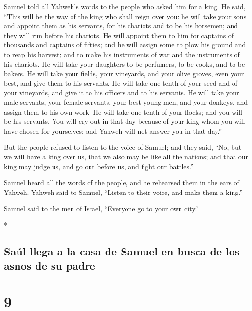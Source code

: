 \begin{paracol}{2}
\begin{otherlanguage}{english}
 Samuel told all Yahweh's words to the people who asked
him for a king.  He said, ``This will be the way of the
king who shall reign over you: he will take your sons and appoint them
as his servants, for his chariots and to be his horsemen; and they will
run before his chariots.  He will appoint them to him for
captains of thousands and captains of fifties; and he will assign some
to plow his ground and to reap his harvest; and to make his instruments
of war and the instruments of his chariots.  He will take
your daughters to be perfumers, to be cooks, and to be bakers.
 He will take your fields, your vineyards, and your olive
groves, even your best, and give them to his servants. 
He will take one tenth of your seed and of your vineyards, and give it
to his officers and to his servants.  He will take your
male servants, your female servants, your best young men, and your
donkeys, and assign them to his own work.  He will take
one tenth of your flocks; and you will be his servants. 
You will cry out in that day because of your king whom you will have
chosen for yourselves; and Yahweh will not answer you in that day.''

 But the people refused to listen to the voice of Samuel;
and they said, ``No, but we will have a king over us, 
that we also may be like all the nations; and that our king may judge
us, and go out before us, and fight our battles.''

 Samuel heard all the words of the people, and he
rehearsed them in the ears of Yahweh.  Yahweh said to
Samuel, ``Listen to their voice, and make them a king.''

Samuel said to the men of Israel, ``Everyone go to your own city.''

\end{otherlanguage}

\switchcolumn[0]*

\hypertarget{sauxfal-llega-a-la-casa-de-samuel-en-busca-de-los-asnos-de-su-padre}{%
\subsection{Saúl llega a la casa de Samuel en busca de los asnos de su
padre}\label{sauxfal-llega-a-la-casa-de-samuel-en-busca-de-los-asnos-de-su-padre}}

\hypertarget{section-16}{%
\section{9}\label{section-16}}


\end{paracol}
